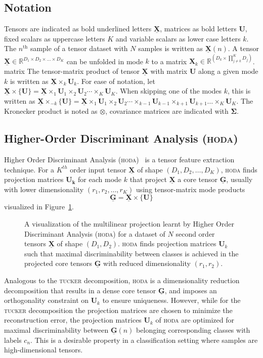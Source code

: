 \documentclass[twocolumn]{article}
\newcommand{\ten}[1]{\underline{\mathbf{#1}}} %
\newcommand{\mat}[1]{\mathbf{#1}} %
\newcommand{\mpr}[2]{\times_{#2} {#1}_{#2}} %
\newcommand{\mmpr}[1]{\times\{#1\}} %
\newcommand{\mmprs}[2]{\times_{-#2}\{#1\}} %
\begin{document}
\subsection{Notation}
Tensors are indicated as bold underlined letters $\ten{X}$, matrices as bold
letters $\mat{U}$, fixed scalars as uppercase letters $K$ and variable
scalars as lower case letters $k$.
The $n^\text{th}$ sample of a tensor dataset with $N$ samples is written as
$\ten{X}(n)$.
A tensor $\ten{X}\in \mathbb{R}^{D_1\times D_2 \times \ldots \times D_K}$ can be unfolded in mode
$k$ to a matrix $\mat{X}_k\in\mathbb{R}^{(D_k\times\prod_{j\neq k}^K D_j)}$.
matrix
The tensor-matrix product of tensor $\ten{X}$ with matrix $\mat{U}$ along a
given mode $k$ is written as $\ten{X}\mpr{\mat{U}}{k}$. For ease of notation, let
$\ten{X}\mmpr{\mat{U}} =
	\ten{X}\mpr{\mat{U}}{1}\mpr{\mat{U}}{2}\cdots\mpr{\mat{U}}{K}$.
When skipping one of the modes $k$, this is
written as $\ten{X}\mmprs{\mat{U}}{k} =
	\ten{X}\mpr{\mat{U}}{1}\mpr{\mat{U}}{2}\cdots\mpr{\mat{U}}{k-1}\mpr{\mat{U}}{k+1}\ldots\mpr{\mat{U}}{K}$.
The Kronecker product is noted as $\otimes$, covariance matrices are indicated  with $\mat{\Sigma}$.

\subsection{Higher-Order Discriminant Analysis (\textsc{hoda})}
Higher Order Discriminant Analysis (\textsc{hoda})~\cite{Phan2010} is a tensor
feature extraction technique. For a $K^{th}$ order input tensor $\ten{X}$ of
shape $(D_1,D_2,\ldots,D_K)$, \textsc{hoda} finds projection matrices $\mat{U_k}$ for each mode $k$
that project $\ten{X}$ a core tensor $\ten{G}$, usually with lower
dimensionality $(r_1,r_2,\ldots,r_K)$ using tensor-matrix mode products
\begin{equation}
	\ten{G}  = \ten{X}\mmpr{\mat{U}}
	\label{eq:hoda-backward}
\end{equation}
visualized in Figure~\ref{fig:hoda-backward}.
\begin{figure}
	\centering
	
	\caption{A visualization of the multilinear projection learnt by Higher Order
		Discriminant Analysis (\textsc{hoda}) for a dataset of $N$ second order tensors
		$\ten{X}$ of shape $(D_1,D_2)$.
		\textsc{hoda} finds projection matrices $\mat{U}_k$ such that maximal
		discriminability between classes is achieved in the projected core tensors
		$\ten{G}$ with reduced dimensionality $(r_1,r_2)$.}
	\label{fig:hoda-backward}
\end{figure}
Analogous to the \textsc{tucker} decomposition, \textsc{hoda} is a dimensionality
reduction decomposition that results in a dense core tensor $\ten{G}$, and
imposes an orthogonality constraint on $\mat{U}_k$ to ensure uniqueness.
However, while for the \textsc{tucker} decomposition the projection matrices
are chosen to minimize the reconstruction error, the projection matrices
$\mat{U}_k$ of \textsc{hoda} are optimized for maximal discriminability between
$\ten{G}(n)$ belonging corresponding classes with labels $c_n$.
This is a desirable property in a classification setting where samples are
high-dimensional tensors.
\end{document}
